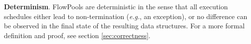 \documentclass[runningheads,a4paper]{llncs}
\begin{document}

\textbf{Determinism}. FlowPools are deterministic in the sense that all
execution schedules either lead to non-termination (\textit{e.g.}, an
exception), or no difference can be observed in the final state of the
resulting data structures. For a more formal definition and proof, see section
\ref{sec:correctness}.

%
%


\end{document}
